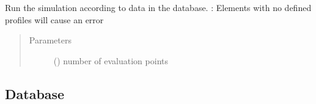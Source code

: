 \documentclass[letterpaper,10pt,english]{sphinxmanual}
\begin{document}
\begin{fulllineitems}
\begin{fulllineitems}
\begin{quote}
\begin{description}
\end{description}\end{quote}

\end{fulllineitems}


\begin{fulllineitems}
\label{\detokenize{api:beamon.simulation.Simulation.simulate}}
Run the simulation according to data in the database.
: Elements with no defined profiles will cause an error
\begin{quote}\begin{description}
\item[{Parameters}] \leavevmode
{} () \textendash{} number of evaluation points

\end{description}\end{quote}

\end{fulllineitems}


\end{fulllineitems}



\subsection{Database}
\label{\detokenize{api:module-beamon.database}}\label{\detokenize{api:database}}
\end{document}
